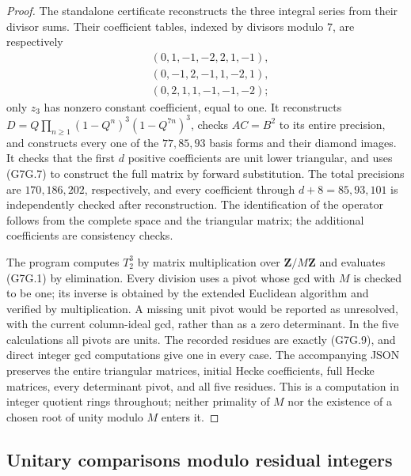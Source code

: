 \documentclass[11pt,a4paper]{article}
\theoremstyle{definition}
\begin{document}
\begin{proof}
The standalone certificate
reconstructs the three integral series from their divisor sums.
Their coefficient tables, indexed by divisors modulo \(7\),
are respectively
\[
\begin{split}
 &(0,1,-1,-2,2,1,-1),\\
 &(0,-1,2,-1,1,-2,1),\\
 &(0,2,1,1,-1,-1,-2);
\end{split}
\]
only \(z_3\) has nonzero constant coefficient, equal to one.
It reconstructs
\(D=Q\prod_{n\ge1}(1-Q^n)^3(1-Q^{7n})^3\),
checks \(AC=B^2\) to its entire precision, and constructs every
one of the \(77,85,93\) basis forms and their diamond images.
It checks that the first \(d\) positive coefficients are
unit lower triangular, and uses (G7G.7) to construct the full
matrix by forward substitution. The total precisions are
\(170,186,202\), respectively, and every coefficient through
\(d+8=85,93,101\) is independently checked after reconstruction.
The identification of the operator follows from the complete
space and the triangular matrix; the additional coefficients
are consistency checks.

The program computes \(T_2^3\) by matrix multiplication over
\(\mathbf Z/M\mathbf Z\) and evaluates (G7G.1) by elimination.
Every division uses a pivot whose gcd with \(M\) is checked
to be one; its inverse is obtained by the extended Euclidean
algorithm and verified by multiplication. A missing unit pivot
would be reported as unresolved, with the current column-ideal
gcd, rather than as a zero determinant. In the five calculations
all pivots are units. The recorded residues are exactly
(G7G.9), and direct integer gcd computations give one in
every case. The accompanying JSON preserves the entire
triangular matrices, initial Hecke coefficients, full Hecke
matrices, every determinant pivot, and all five residues.
This is a computation in integer quotient rings throughout;
neither primality of \(M\) nor the existence of a chosen
root of unity modulo \(M\) enters it.
\end{proof}

\subsection{Unitary comparisons modulo residual integers}
\label{sec:u3-residual-ring}
\end{document}

